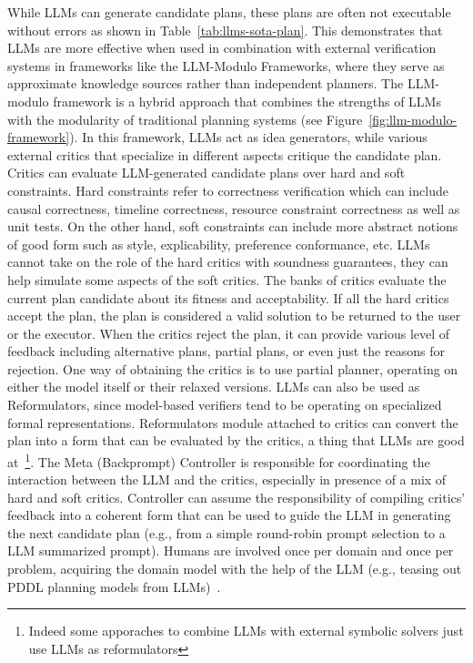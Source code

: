 While LLMs can generate candidate plans, these plans are often not executable without errors as shown in Table~\ref{tab:llms-sota-plan}.
This demonstrates that LLMs are more effective when used in combination with external verification systems in frameworks like the LLM-Modulo Frameworks, where they serve as approximate knowledge sources rather than independent planners.
The LLM-modulo framework is a hybrid approach that combines the strengths of LLMs with the modularity of traditional planning systems (see Figure~\ref{fig:llm-modulo-framework}).
In this framework, LLMs act as idea generators, while various external critics that specialize in different aspects critique the candidate plan.
Critics can evaluate LLM-generated candidate plans over hard and soft constraints.
Hard constraints refer to correctness verification which can include causal correctness, timeline correctness, resource constraint correctness as well as unit tests.
On the other hand, soft constraints can include more abstract notions of good form such as style, explicability, preference conformance, etc.
LLMs cannot take on the role of the hard critics with soundness guarantees, they can help simulate some aspects of the soft critics.
The banks of critics evaluate the current plan candidate about its fitness and acceptability.
If all the hard critics accept the plan, the plan is considered a valid solution to be returned to the user or the executor.
When the critics reject the plan, it can provide various level of feedback including alternative plans, partial plans, or even just the reasons for rejection.
One way of obtaining the critics is to use partial planner, operating on either the model itself or their relaxed versions\cite{bryce2007tutorial}.
LLMs can also be used as Reformulators, since model-based verifiers tend to be operating on specialized formal representations.
Reformulators module attached to critics can convert the plan into a form that can be evaluated by the critics, a thing that LLMs are good at~\cite{olmo2021gpt3toplan}\footnote{Indeed some apporaches to combine LLMs with external symbolic solvers just use LLMs as reformulators}.
The Meta (Backprompt) Controller is responsible for coordinating the interaction between the LLM and the critics, especially in presence of a mix of hard and soft critics.
Controller can assume the responsibility of compiling critics' feedback into a coherent form that can be used to guide the LLM in generating the next candidate plan (e.g., from a simple round-robin prompt selection to a LLM summarized prompt).
Humans are involved once per domain and once per problem, acquiring the domain model with the help of the LLM (e.g., teasing out PDDL planning models from LLMs)~\cite{guan2023leveraging}.
